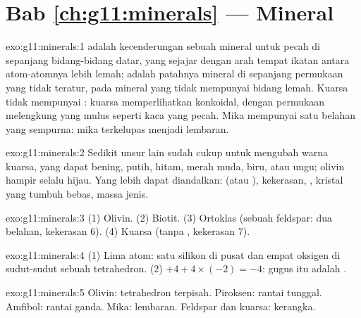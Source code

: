 \section*{Bab \ref{ch:g11:minerals} --- Mineral}

\begin{solution}{exo:g11:minerals:1}
 adalah kecenderungan sebuah mineral untuk pecah di sepanjang bidang-bidang
datar, yang sejajar dengan arah tempat ikatan antara atom-atomnya lebih lemah;
 adalah patahnya mineral di sepanjang permukaan yang tidak teratur, pada
mineral yang tidak mempunyai bidang lemah. Kuarsa tidak mempunyai :
kuarsa memperlihatkan  konkoidal, dengan permukaan melengkung yang mulus
seperti kaca yang pecah. Mika mempunyai satu belahan yang sempurna: mika
terkelupas menjadi lembaran.
\end{solution}

\begin{solution}{exo:g11:minerals:2}
Sedikit unsur lain sudah cukup untuk mengubah warna kuarsa, yang dapat bening,
putih, hitam, merah muda, biru, atau ungu; olivin hampir selalu hijau. Yang lebih
dapat diandalkan:  (atau ), kekerasan, ,  kristal yang
tumbuh bebas, massa jenis.
\end{solution}

\begin{solution}{exo:g11:minerals:3}
(1) Olivin. (2) Biotit. (3) Ortoklas (sebuah feldspar: dua belahan, kekerasan
6). (4) Kuarsa (tanpa , kekerasan 7).
\end{solution}

\begin{solution}{exo:g11:minerals:4}
(1) Lima atom: satu silikon di pusat dan empat oksigen di sudut-sudut sebuah
tetrahedron. (2) $+4 + 4 \times (-2) = -4$: gugus itu adalah .
\end{solution}

\begin{solution}{exo:g11:minerals:5}
Olivin: tetrahedron terpisah. Piroksen: rantai tunggal. Amfibol: rantai ganda.
Mika: lembaran. Feldspar dan kuarsa: kerangka.
\end{solution}

